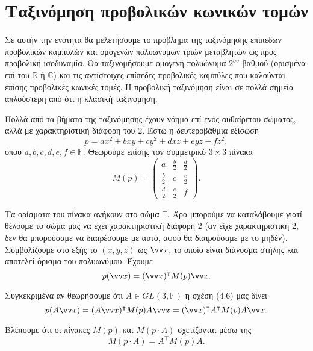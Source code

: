 \documentclass[12pt, a4paper]{book}
\begin{document}
 
\section{Ταξινόμηση προβολικών κωνικών τομών}


Σε αυτήν την ενότητα θα μελετήσουμε το πρόβλημα της ταξινόμησης επίπεδων προβολικών καμπυλών και ομογενών πολυωνύμων τριών μεταβλητών ως προς προβολική ισοδυναμία. Θα ταξινομήσουμε ομογενή πολυώνυμα $2^{ου}$ βαθμού (ορισμένα επί του $\mathbb{R}$ ή $\mathbb{C}$) και τις αντίστοιχες επίπεδες προβολικές καμπύλες που καλούνται επίσης προβολικές κωνικές τομές. Η προβολική ταξινόμηση είναι σε πολλά σημεία απλούστερη από ότι η κλασική ταξινόμηση.

Πολλά από τα βήματα της ταξινόμησης έχουν νόημα επί ενός αυθαίρετου σώματος, αλλά με χαρακτηριστική διάφορη του 2. Έστω η δευτεροβάθμια εξίσωση
\begin{equation}
p=ax^2+bxy+cy^2+dxz+eyz+fz^2,
\end{equation}
όπου $a,b,c,d,e,f \in \mathbb{F}$. Θεωρούμε επίσης τον συμμετρικό $3\times 3$ πίνακα
\begin{displaymath}
M(p)=\begin{pmatrix}a&\frac{b}{2}&\frac{d}{2}\\ \frac{b}{2}&c&\frac{e}{2}\\ \frac{d}{2}&\frac{e}{2}&f \end{pmatrix}.
\end{displaymath}

Τα ορίσματα του πίνακα ανήκουν στο σώμα $\mathbb{F}$. Άρα μπορούμε να καταλάβουμε γιατί θέλουμε το σώμα μας να έχει χαρακτηριστική διάφορη $2$ (αν είχε χαρακτηριστική $2$, δεν θα μπορούσαμε να διαιρέσουμε με αυτό, αφού θα διαιρούσαμε με το μηδέν). Συμβολίζουμε στο εξής το $(x,y,z)$ ως $\vv x$, το οποίο είναι διάνυσμα στήλης και αποτελεί όρισμα του πολυωνύμου.  Έχουμε
\begin{equation}
p(\vv x)=(\vv x)^\intercal M(p)\vv x.
\end{equation}

Συγκεκριμένα αν θεωρήσουμε ότι $A \in GL(3, \mathbb{F})$ η σχέση (4.6) μας δίνει
\begin{displaymath}
p(A \vv x)=(A \vv x)^\intercal M(p)A \vv x= (\vv x)^\intercal A^\intercal M(p)A \vv x.
\end{displaymath}

Βλέπουμε ότι οι πίνακες $M(p)$ και $M(p \cdot A)$ σχετίζονται μέσω της
\begin{displaymath}
M(p \cdot A)=A^\intercal M(p)A.
\end{displaymath}
\end{document}
